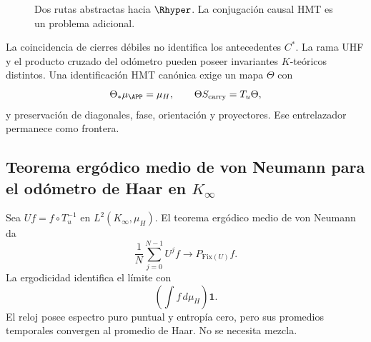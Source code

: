 \begin{figure}[H]
\centering
{}
\caption{Dos rutas abstractas hacia \(\Rhyper\). La conjugación causal HMT
es un problema adicional.}
\label{p12-83-c21-s3:fig:two-routes-r}
\end{figure}

La coincidencia de cierres débiles no identifica los antecedentes
\(C^*\). La rama UHF y el producto cruzado del odómetro pueden poseer
invariantes \(K\)-teóricos distintos. Una identificación HMT canónica exige
un mapa \(\Theta\) con
\[
  \Theta_*\mu_{\APP}=\mu_H,
  \qquad
  \Theta S_{\rm carry}=T_u\Theta,
\]
y preservación de diagonales, fase, orientación y proyectores. Ese
entrelazador permanece como frontera.

\subsection{Teorema ergódico medio de von Neumann para el odómetro de Haar en \(K_\infty\)}

Sea \(U f=f\circ T_u^{-1}\) en \(L^2(K_\infty,\mu_H)\). El teorema
ergódico medio de von Neumann \citep{vonneumann1932ergodic} da
\[
 \frac1N\sum_{j=0}^{N-1}U^jf
 \longrightarrow
 P_{\mathrm{Fix}(U)}f.
\]
La ergodicidad identifica el límite con
\[
  \left(\int f\,d\mu_H\right)\mathbf1.
\]
El reloj posee espectro puro puntual y entropía cero, pero sus promedios
temporales convergen al promedio de Haar. No se necesita mezcla.

